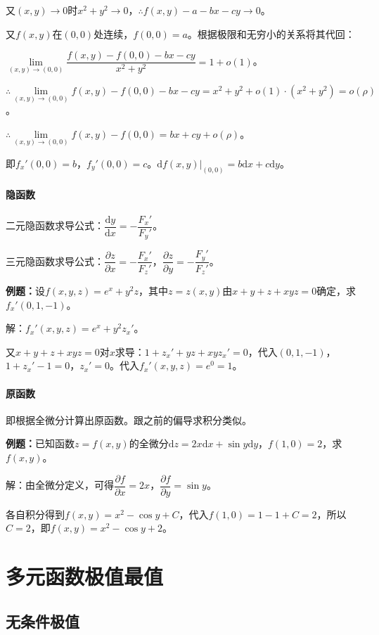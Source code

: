 \documentclass[UTF8, 12pt]{ctexart}
\begin{document}
又$(x,y)\to0$时$x^2+y^2\to0$，$\therefore f(x,y)-a-bx-cy\to0$。

又$f(x,y)$在$(0,0)$处连续，$f(0,0)=a$。根据极限和无穷小的关系将其代回：

$\lim\limits_{(x,y)\to(0,0)}\dfrac{f(x,y)-f(0,0)-bx-cy}{x^2+y^2}=1+o(1)$。

$\therefore\lim\limits_{(x,y)\to(0,0)}f(x,y)-f(0,0)-bx-cy=x^2+y^2+o(1)\cdot(x^2+y^2)=o(\rho)$。

$\therefore\lim\limits_{(x,y)\to(0,0)}f(x,y)-f(0,0)=bx+cy+o(\rho)$。

即$f_x'(0,0)=b$，$f_y'(0,0)=c$。$\textrm{d}f(x,y)|_{(0,0)}=b\textrm{d}x+c\textrm{d}y$。

\paragraph{隐函数} \leavevmode \medskip

二元隐函数求导公式：$\dfrac{\textrm{d}y}{\textrm{d}x}=-\dfrac{F_x'}{F_y'}$。

三元隐函数求导公式：$\dfrac{\partial z}{\partial x}=-\dfrac{F_x'}{F_z'}$，$\dfrac{\partial z}{\partial y}=-\dfrac{F_y'}{F_z'}$。

\textbf{例题：}设$f(x,y,z)=e^x+y^2z$，其中$z=z(x,y)$由$x+y+z+xyz=0$确定，求$f_x'(0,1,-1)$。

解：$f_x'(x,y,z)=e^x+y^2z_x'$。

又$x+y+z+xyz=0$对$x$求导：$1+z_x'+yz+xyz_x'=0$，代入$(0,1,-1)$，$1+z_x'-1=0$，$z_x'=0$。代入$f_x'(x,y,z)=e^0=1$。

\paragraph{原函数} \leavevmode \medskip

即根据全微分计算出原函数。跟之前的偏导求积分类似。

\textbf{例题：}已知函数$z=f(x,y)$的全微分$\textrm{d}z=2x\textrm{d}x+\sin y\textrm{d}y$，$f(1,0)=2$，求$f(x,y)$。

解：由全微分定义，可得$\dfrac{\partial f}{\partial x}=2x$，$\dfrac{\partial f}{\partial y}=\sin y$。

各自积分得到$f(x,y)=x^2-\cos y+C$，代入$f(1,0)=1-1+C=2$，所以$C=2$，即$f(x,y)=x^2-\cos y+2$。

\section{多元函数极值最值}

\subsection{无条件极值}
\end{document}
